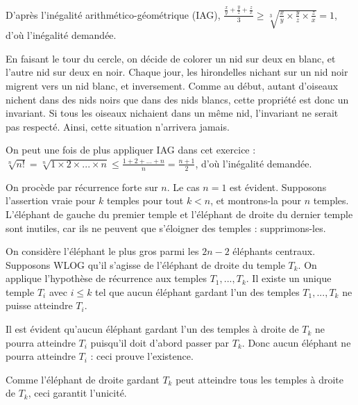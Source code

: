 \begin{sol}
D'apr\`es l'in\'egalit\'e arithm\'etico-g\'eom\'etrique (IAG),
$\frac{\frac{x}{y}+\frac{y}{z}+\frac{z}{x}}{3} \geq \sqrt[3]{\frac{x}{y}\times\frac{y}{z}\times\frac{z}{x}} = 1$,
d'o\`u l'in\'egalit\'e demand\'ee.
\end{sol}

\begin{sol}
En faisant le tour du cercle, on d\'ecide de colorer un nid sur deux en blanc, et l'autre nid sur deux en noir. Chaque jour, les hirondelles nichant sur un nid noir migrent vers un nid blanc, et inversement. Comme au d\'ebut,
autant d'oiseaux nichent dans des nids noirs que dans des nids blancs, cette propri\'et\'e est donc
un invariant. Si tous les oiseaux nichaient dans un m\^eme nid, l'invariant ne serait pas
respect\'e. Ainsi, cette situation n'arrivera jamais. 
\end{sol}

\begin{sol}
On peut une fois de plus appliquer IAG dans cet exercice :
$\sqrt[n]{n!} = \sqrt[n]{1 \times 2 \times ... \times n} \leq \frac{1+2+...+n}{n} = \frac{n+1}{2}$,
d'o\`u l'in\'egalit\'e demand\'ee.
\end{sol}

\begin{sol}
On proc\`ede par r\'ecurrence forte sur $n$. Le cas $n = 1$ est \'evident. Supposons l’assertion vraie pour $k$ temples pour tout $k < n$, et montrons-la pour $n$ temples. L’\'el\'ephant de gauche du premier temple et l’\'el\'ephant de droite du dernier temple sont inutiles, car ils ne peuvent que s'\'eloigner des temples : supprimons-les.

On consid\`ere l’\'el\'ephant le plus gros parmi les $2n-2$ \'el\'ephants centraux. Supposons WLOG qu’il s'agisse de l’\'el\'ephant de droite du temple $T_{k}$. On applique l’hypoth\`ese de r\'ecurrence aux temples  $T_{1}, ..., T_{k}$. Il existe un unique temple $T_{i}$ avec $i \leq k$ tel que aucun \'el\'ephant gardant l’un des temples  $T_{1}, ..., T_{k}$ ne puisse atteindre $T_{i}$.

Il est \'evident qu’aucun  \'el\'ephant gardant l’un des temples  \`a droite de $T_{k}$ ne pourra atteindre $T_{i}$ puisqu’il doit d’abord passer par $T_{k}$. Donc aucun \'el\'ephant ne pourra atteindre $T_{i}$ : ceci prouve l’existence.

Comme l’\'el\'ephant de droite gardant $T_{k}$ peut atteindre tous les temples \`a droite de $T_{k}$, ceci garantit l’unicit\'e.
\end{sol}
